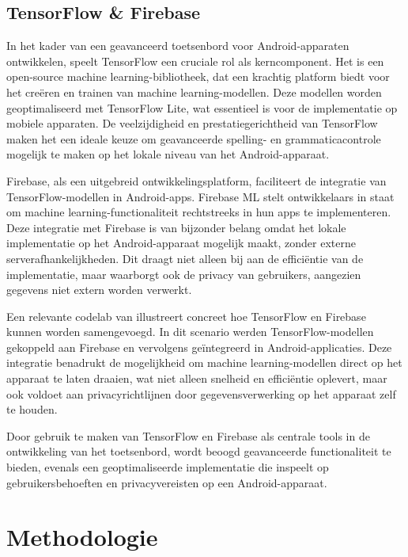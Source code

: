 \subsection{TensorFlow \& Firebase}

In het kader van een geavanceerd toetsenbord voor Android-apparaten ontwikkelen, speelt TensorFlow een cruciale rol als kerncomponent. Het is een open-source machine learning-bibliotheek, dat een krachtig platform biedt voor het creëren en trainen van machine learning-modellen. Deze modellen worden geoptimaliseerd met TensorFlow Lite, wat essentieel is voor de implementatie op mobiele apparaten. De veelzijdigheid en prestatiegerichtheid van TensorFlow maken het een ideale keuze om geavanceerde spelling- en grammaticacontrole mogelijk te maken op het lokale niveau van het Android-apparaat.

Firebase, als een uitgebreid ontwikkelingsplatform, faciliteert de integratie van \\ TensorFlow-mo\-del\-len in Android-apps. Firebase ML stelt ontwikkelaars in staat om machine learning-func\-tio\-na\-li\-teit rechtstreeks in hun apps te implementeren. Deze integratie met Firebase is van bijzonder belang omdat het lokale implementatie op het Android-apparaat mogelijk maakt, zonder externe serverafhankelijkheden. Dit draagt niet alleen bij aan de efficiëntie van de implementatie, maar waarborgt ook de privacy van gebruikers, aangezien gegevens niet extern worden verwerkt.

Een relevante codelab van \textcite{ulukaya2023} illustreert concreet hoe TensorFlow en Firebase kunnen worden samengevoegd. In dit scenario werden Tensor\-Flow-modellen gekoppeld aan Firebase en vervolgens geïntegreerd in Android-applicaties. Deze integratie benadrukt de mogelijkheid om machine learning-mo\-del\-len direct op het apparaat te laten draaien, wat niet alleen snelheid en efficiëntie oplevert, maar ook voldoet aan privacyrichtlijnen door gegevensverwerking op het apparaat zelf te houden.

Door gebruik te maken van TensorFlow en Firebase als centrale tools in de ontwikkeling van het toetsenbord, wordt beoogd geavanceerde func\-tio\-na\-li\-teit te bieden, evenals een geoptimaliseerde implementatie die inspeelt op gebruikersbehoeften en privacyvereisten op een Android-apparaat.

\section{Methodologie}%
\label{sec:methodologie}

